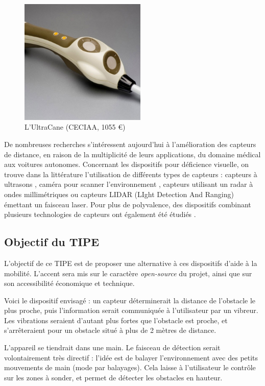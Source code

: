 \documentclass[a4paper, 11pt]{article}
\begin{document}
\begin{figure}[H]
\centering
\includegraphics[height=6cm]{images/ultracane.jpg}
\caption{L’UltraCane (CECIAA, 1055 €)}
\end{figure}

De nombreuses recherches s'intéressent aujourd'hui à l'amélioration des capteurs de distance, en raison de la multiplicité de leurs applications, du domaine médical aux voitures autonomes. Concernant les dispositifs pour déficience visuelle, on trouve dans la littérature l'utilisation de différents types de capteurs : capteurs à ultrasons \cite{ultrasons}, caméra pour scanner l'environnement \cite{camera}, capteurs utilisant un radar à ondes millimétriques \cite{radar} ou capteurs LIDAR (LIght Detection And Ranging) \cite{lidar} émettant un faisceau laser. Pour plus de polyvalence, des dispositifs combinant plusieurs technologies de capteurs ont également été étudiés \cite{multicapteur}.


\subsection{Objectif du TIPE}

\par  L’objectif de ce TIPE est de proposer une alternative à ces dispositifs d'aide à la mobilité. L'accent sera mis sur le caractère \textit{open-source} du projet, ainsi que sur son accessibilité économique et technique.

\par Voici le dispositif envisagé : un capteur déterminerait la distance de l'obstacle le plus proche, puis l'information serait communiquée à l'utilisateur par un vibreur. Les vibrations seraient d'autant plus fortes que l'obstacle est proche, et s'arrêteraient pour un obstacle situé à plus de 2 mètres de distance.

\par L'appareil se tiendrait dans une main. Le faisceau de détection serait volontairement très directif : l'idée est de balayer l'environnement avec des petits mouvements de main (mode par balayages). Cela laisse à l'utilisateur le contrôle sur les zones à sonder, et permet de détecter les obstacles en hauteur.
\end{document}
